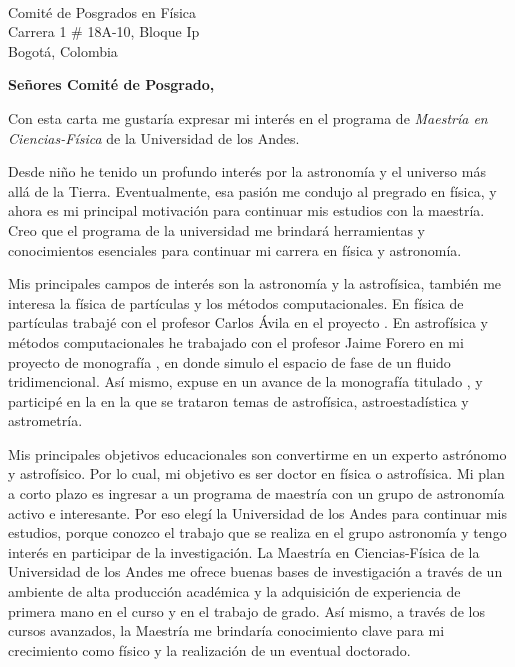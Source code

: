 \documentclass[10pt]{letter} %
\begin{document}

\begin{letter}{\\ Comité de Posgrados en Física \\ Carrera 1 \# 18A-10, Bloque Ip \\ Bogotá, Colombia} %


\opening{\textbf{Señores Comité de Posgrado,}}
Con esta carta me gustaría expresar mi interés en el programa de \emph{Maestría en Ciencias-Física} de la Universidad de los Andes.


Desde niño he tenido un profundo interés por la astronomía y el universo más allá de la Tierra. Eventualmente, esa pasión me condujo al pregrado en física, y ahora es mi principal motivación para continuar mis estudios con la maestría. Creo que el programa de la universidad me brindará herramientas y conocimientos esenciales para continuar mi carrera en física y astronomía.


Mis principales campos de interés son la astronomía y la astrofísica, también me interesa la física de partículas y los métodos computacionales. En física de partículas trabajé con el profesor Carlos Ávila en el proyecto . En astrofísica y métodos computacionales he trabajado con el profesor Jaime Forero en mi proyecto de monografía , en donde simulo el espacio de fase de un fluido tridimencional. Así mismo, expuse en  un avance de la monografía titulado , y participé en la  en la que se trataron temas de astrofísica, astroestadística y astrometría.


Mis principales objetivos educacionales son convertirme en un experto astrónomo y astrofísico. Por lo cual, mi objetivo es ser doctor en física o astrofísica. Mi plan a corto plazo es ingresar a un programa de maestría con un grupo de astronomía activo e interesante. Por eso elegí la Universidad de los Andes para continuar mis estudios, porque conozco el trabajo que se realiza en el grupo astronomía y tengo interés en participar de la investigación. La Maestría en Ciencias-Física de la Universidad de los Andes me ofrece buenas bases de investigación a través de un ambiente de alta producción académica y la adquisición de experiencia de primera mano en el curso  y en el trabajo de grado. Así mismo, a través de los cursos avanzados, la Maestría me brindaría conocimiento clave para mi crecimiento como físico y la realización de un eventual doctorado.



\end{letter}
\end{document}
